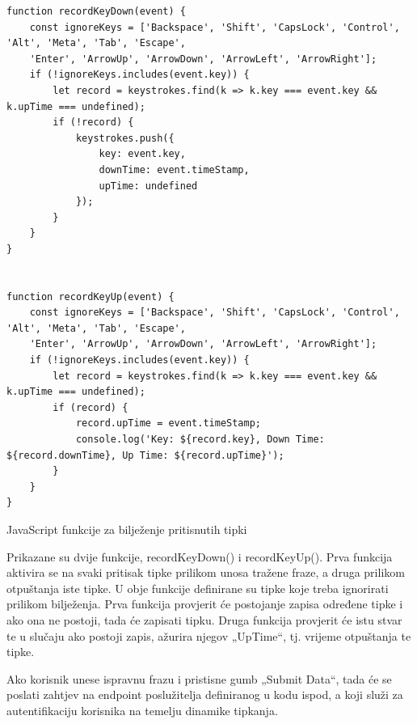 \documentclass[]{foi}
\begin{document}
\begin{listing}
\begin{verbatim}
function recordKeyDown(event) {
    const ignoreKeys = ['Backspace', 'Shift', 'CapsLock', 'Control', 'Alt', 'Meta', 'Tab', 'Escape', 
    'Enter', 'ArrowUp', 'ArrowDown', 'ArrowLeft', 'ArrowRight'];
    if (!ignoreKeys.includes(event.key)) {
        let record = keystrokes.find(k => k.key === event.key && k.upTime === undefined);
        if (!record) {
            keystrokes.push({
                key: event.key,
                downTime: event.timeStamp,
                upTime: undefined
            });
        }
    }
}


function recordKeyUp(event) {
    const ignoreKeys = ['Backspace', 'Shift', 'CapsLock', 'Control', 'Alt', 'Meta', 'Tab', 'Escape', 
    'Enter', 'ArrowUp', 'ArrowDown', 'ArrowLeft', 'ArrowRight'];
    if (!ignoreKeys.includes(event.key)) {
        let record = keystrokes.find(k => k.key === event.key && k.upTime === undefined);
        if (record) {
            record.upTime = event.timeStamp;
            console.log('Key: ${record.key}, Down Time: ${record.downTime}, Up Time: ${record.upTime}');
        }
    }
}
\end{verbatim}
\caption{JavaScript funkcije za bilježenje pritisnutih tipki}
\label{lst:javascript}
\end{listing}


Prikazane su dvije funkcije, recordKeyDown() i recordKeyUp(). Prva funkcija aktivira se na svaki pritisak tipke prilikom unosa tražene fraze, a druga prilikom otpuštanja iste tipke. U obje funkcije definirane su tipke koje treba ignorirati prilikom bilježenja. Prva funkcija provjerit će postojanje zapisa određene tipke i ako ona ne postoji, tada će zapisati tipku. Druga funkcija provjerit će istu stvar te u slučaju ako postoji zapis, ažurira njegov „UpTime“, tj. vrijeme otpuštanja te tipke.

Ako korisnik unese ispravnu frazu i pristisne gumb „Submit Data“, tada će se poslati zahtjev na endpoint poslužitelja definiranog u kodu ispod, a koji služi za autentifikaciju korisnika na temelju dinamike tipkanja.
\end{document}

